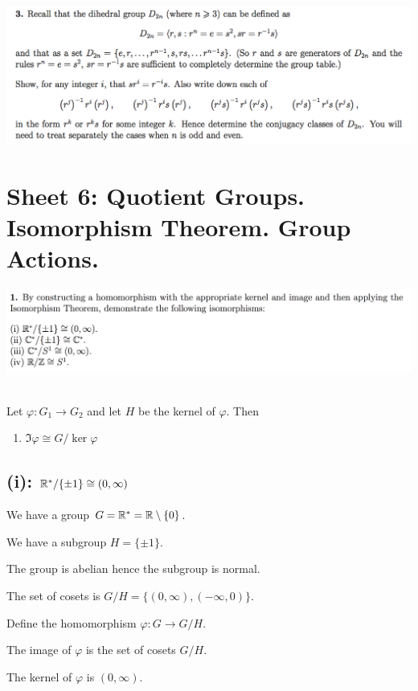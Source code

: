 \documentclass[12pt]{article}
\begin{document}
\begin{mdframed}
\includegraphics[width=400pt]{img/abstract-algebra-oxford-M1-5-3.png}
\end{mdframed}

\newpage
\section{Sheet 6: Quotient Groups. Isomorphism Theorem. Group Actions.}

\begin{mdframed}
\includegraphics[width=400pt]{img/abstract-algebra-oxford-M1-6-1.png}
\end{mdframed}

\begin{theorem*}~\\
  Let $\varphi:G_1 \to G_2$ and let $H$ be the kernel of $\varphi$. Then
  \begin{enumerate}
  \item $\Im \varphi \cong G/ \ker \varphi$
  \end{enumerate}
\end{theorem*}

\subsection*{(i): $\mathbb{R}^*/\{\pm 1\} \cong (0, \infty)$}

We have a group $G = \mathbb{R}^* = \mathbb{R}\setminus\{0\}$.

We have a subgroup $H = \{\pm 1\}$.

The group is abelian hence the subgroup is normal.

The set of cosets is $G/H = \{(0, \infty), (-\infty, 0)\}$.

Define the homomorphism $\varphi: G \to G/H$.

The image of $\varphi$ is the set of cosets $G/H$.

The kernel of $\varphi$ is $(0, \infty)$.
\end{document}
